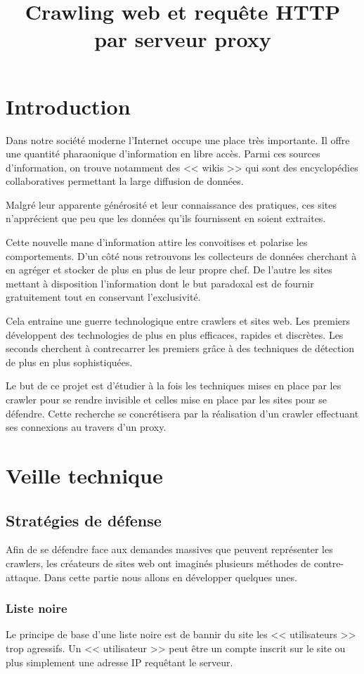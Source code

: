 \documentclass[hideweeklyreports,noposter]{polytech/polytech}
\title{Crawling web et requête HTTP par serveur proxy}
\begin{document}
\part{Introduction}
	Dans notre société moderne l'Internet occupe une place très importante.
	Il offre une quantité pharaonique d'information en libre accès.
	Parmi ces sources d'information, on trouve notamment des << wikis >> qui sont des encyclopédies collaboratives permettant la large diffusion de données.
	
	Malgré leur apparente générosité et leur connaissance des pratiques, ces sites n'apprécient que peu que les données qu'ils fournissent en soient extraites.
	
	Cette nouvelle mane d'information attire les convoitises et polarise les comportements.
	D'un côté nous retrouvons les collecteurs de données cherchant à en agréger et stocker de plus en plus de leur propre chef.
	De l'autre les sites mettant à disposition l'information dont le but paradoxal est de fournir gratuitement tout en conservant l'exclusivité.
	
	Cela entraine une guerre technologique entre crawlers et sites web.
	Les premiers développent des technologies de plus en plus efficaces, rapides et discrètes.
	Les seconds cherchent à contrecarrer les premiers grâce à des techniques de détection de plus en plus sophistiquées.

	Le but de ce projet est d'étudier à la fois les techniques mises en place par les crawler pour se rendre invisible et celles mise en place par les sites pour se défendre.
	Cette recherche se concrétisera par la réalisation d'un crawler effectuant ses connexions au travers d'un proxy.

	
\part{Veille technique}
	\chapter{Stratégies de défense}
		Afin de se défendre face aux demandes massives que peuvent représenter les crawlers, les créateurs de sites web ont imaginés plusieurs méthodes de contre-attaque.
		Dans cette partie nous allons en développer quelques unes.
		
		\section{Liste noire\label{sec:liste_noire}}
			Le principe de base d'une liste noire est de bannir du site les << utilisateurs >> trop agressifs.
			Un << utilisateur >> peut être un compte inscrit sur le site ou plus simplement une adresse IP requêtant le serveur.	
			
\end{document}
